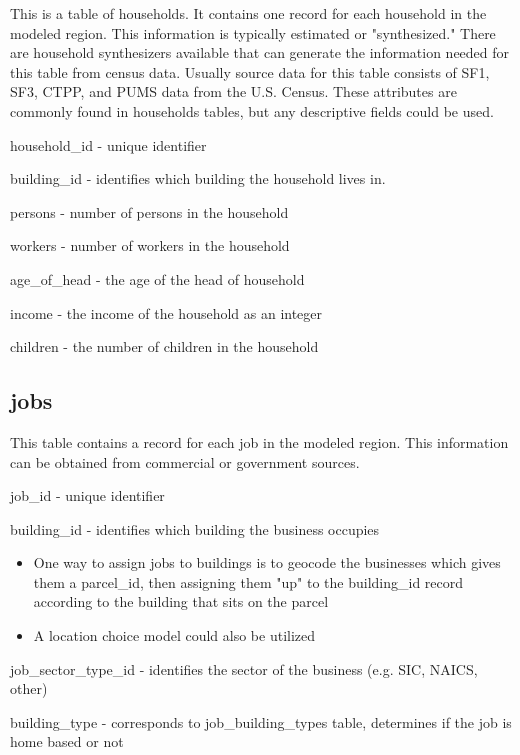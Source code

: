 This is a table of households. It contains one record for each household in the modeled region. This information is typically estimated or "synthesized." There are household synthesizers available that can generate the information needed for this table from census data. Usually source data for this table consists of SF1, SF3, CTPP, and PUMS data from the U.S. Census.  These attributes are commonly found in households tables, but any descriptive fields could be used.

\begin{description}
\item household\_id - unique identifier
\item building\_id - identifies which building the household lives in.
\item persons - number of persons in the household
\item workers - number of workers in the household
\item age\_of\_head - the age of the head of household
\item income - the income of the household as an integer
\item children - the number of children in the household
\end{description}

\subsection{jobs} 

This table contains a record for each job in the modeled region. This information can be obtained from commercial or government sources.

\begin{description}
\item job\_id - unique identifier
\item building\_id - identifies which building the business occupies
  \begin{itemize}
  \item One way to assign jobs to buildings is to geocode the businesses which gives them a parcel\_id, then assigning them "up" to the building\_id record according to the building that sits on the parcel
  \item A location choice model could also be utilized 
  \end{itemize}
\item job\_sector\_type\_id - identifies the sector of the business (e.g. SIC, NAICS, other)
\item building\_type - corresponds to job\_building\_types table, determines if the job is home based or not 
\end{description}

